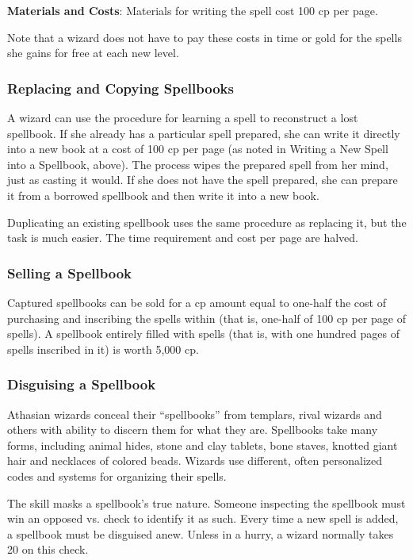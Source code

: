 \textbf{Materials and Costs}: Materials for writing the spell cost 100 cp per page.

Note that a wizard does not have to pay these costs in time or gold for the spells she gains for free at each new level.

\subsubsection{Replacing and Copying Spellbooks}
A wizard can use the procedure for learning a spell to reconstruct a lost spellbook. If she already has a particular spell prepared, she can write it directly into a new book at a cost of 100 cp per page (as noted in Writing a New Spell into a Spellbook, above). The process wipes the prepared spell from her mind, just as casting it would. If she does not have the spell prepared, she can prepare it from a borrowed spellbook and then write it into a new book.

Duplicating an existing spellbook uses the same procedure as replacing it, but the task is much easier. The time requirement and cost per page are halved.

\subsubsection{Selling a Spellbook}
Captured spellbooks can be sold for a cp amount equal to one-half the cost of purchasing and inscribing the spells within (that is, one-half of 100 cp per page of spells). A spellbook entirely filled with spells (that is, with one hundred pages of spells inscribed in it) is worth 5,000 cp.

\subsubsection{Disguising a Spellbook}
Athasian wizards conceal their ``spellbooks'' from templars, rival wizards and others with ability to discern them for what they are. Spellbooks take many forms, including animal hides, stone and clay tablets, bone staves, knotted giant hair and necklaces of colored beads. Wizards use different, often personalized codes and systems for organizing their spells.

The  skill masks a spellbook's true nature. Someone inspecting the spellbook must win an opposed  vs.  check to identify it as such. Every time a new spell is added, a spellbook must be disguised anew. Unless in a hurry, a wizard normally takes 20 on this check.